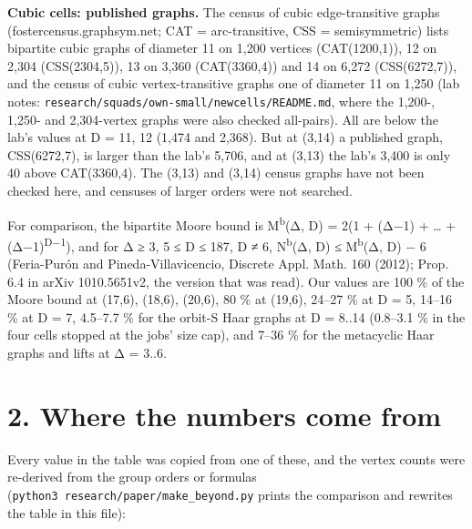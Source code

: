 \documentclass[
  10pt,
]{article}
\begin{document}
\textbf{Cubic cells: published graphs.} The census of cubic edge-transitive graphs (fostercensus.graphsym.net; CAT =
arc-transitive, CSS = semisymmetric) lists bipartite cubic graphs of diameter 11 on 1,200 vertices (CAT(1200,1)), 12
on 2,304 (CSS(2304,5)), 13 on 3,360 (CAT(3360,4)) and 14 on 6,272 (CSS(6272,7)), and the census of cubic
vertex-transitive graphs one of diameter 11 on 1,250 (lab notes:
\texttt{research/\allowbreak{}squads/\allowbreak{}own-small/\allowbreak{}newcells/\allowbreak{}README.md}, where the 1,200-, 1,250- and 2,304-vertex graphs were also
checked all-pairs). All are below the lab's values at D = 11, 12 (1,474 and 2,368). But at (3,14) a published graph,
CSS(6272,7), is larger than the lab's 5,706, and at (3,13) the lab's 3,400 is only 40 above CAT(3360,4). The (3,13)
and (3,14) census graphs have not been checked here, and censuses of larger orders were not searched.

For comparison, the bipartite Moore bound is M\textsuperscript{b}(Δ, D) = 2(1 + (Δ−1) + \ldots{} +
(Δ−1)\textsuperscript{D−1}), and for Δ ≥ 3, 5 ≤ D ≤ 187, D ≠ 6, N\textsuperscript{b}(Δ, D) ≤ M\textsuperscript{b}(Δ,
D) − 6 (Feria-Purón and Pineda-Villavicencio, Discrete Appl. Math. 160 (2012); Prop. 6.4 in arXiv 1010.5651v2, the
version that was read). Our values are 100 \% of the Moore bound at (17,6), (18,6), (20,6), 80 \% at (19,6), 24--27 \%
at D = 5, 14--16 \% at D = 7, 4.5--7.7 \% for the orbit-S Haar graphs at D = 8..14 (0.8--3.1 \% in the four cells
stopped at the jobs' size cap), and 7--36 \% for the metacyclic Haar graphs and lifts at Δ = 3..6.

\hypertarget{where-the-numbers-come-from}{%
\section{2. Where the numbers come from}\label{where-the-numbers-come-from}}

Every value in the table was copied from one of these, and the vertex counts were re-derived from the group orders or
formulas (\texttt{python3\ research/\allowbreak{}paper/\allowbreak{}make\_\allowbreak{}beyond.py} prints the comparison and rewrites the table in this file):
\end{document}
